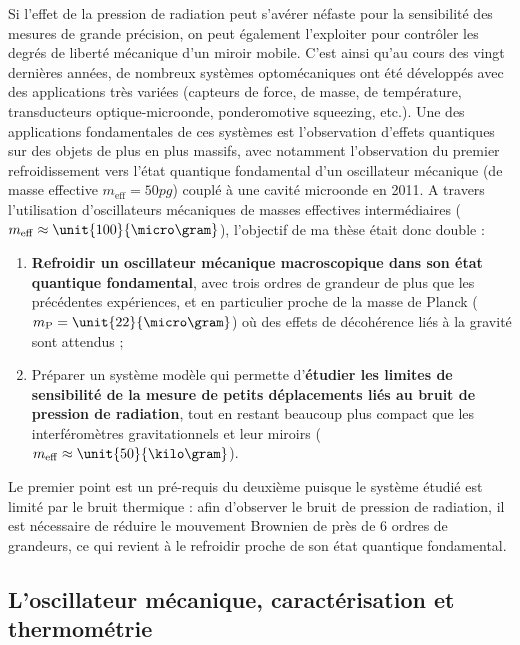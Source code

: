 \documentclass[12pt,a4paper]{article}
\begin{document}
Si l'effet de la pression de radiation peut s'avérer néfaste pour la sensibilité des mesures de grande précision, on peut également l'exploiter pour contrôler les degrés de liberté mécanique d'un miroir mobile.
C'est ainsi qu'au cours des vingt dernières années, de nombreux systèmes optomécaniques ont été développés avec des applications très variées (capteurs de force, de masse, de température, transducteurs optique-microonde, ponderomotive squeezing, etc.).
Une des applications fondamentales de ces systèmes est l'observation d'effets quantiques sur des objets de plus en plus massifs, avec notamment l'observation du premier refroidissement vers l'état quantique fondamental d'un oscillateur mécanique (de masse effective $m_\mathrm{eff} = \unit{50}{pg}$) couplé à une cavité microonde en 2011.
A travers l'utilisation d'oscillateurs mécaniques de masses effectives intermédiaires ($m_\mathrm{eff} \approx \unit{100}{\micro\gram}$), l'objectif de ma thèse était donc double :
\begin{enumerate}
\item \textbf{Refroidir un oscillateur mécanique macroscopique dans son état quantique fondamental}, avec trois ordres de grandeur de plus que les précédentes expériences, et en particulier proche de la masse de Planck ($m_\mathrm{P}=\unit{22}{\micro\gram}$) où des effets de décohérence liés à la gravité sont attendus ;
\item Préparer un système modèle qui permette d'\textbf{étudier les limites de sensibilité de la mesure de petits déplacements liés au bruit de pression de radiation}, tout en restant beaucoup plus compact que les interféromètres gravitationnels et leur miroirs ($m_\mathrm{eff}\approx\unit{50}{\kilo\gram}$).
\end{enumerate}
Le premier point est un pré-requis du deuxième puisque le système étudié est limité par le bruit thermique : afin d'observer le bruit de pression de radiation, il est nécessaire de réduire le mouvement Brownien de près de 6 ordres de grandeurs, ce qui revient à le refroidir proche de son état quantique fondamental.

\subsection{L'oscillateur mécanique, caractérisation et thermométrie}
\end{document}
